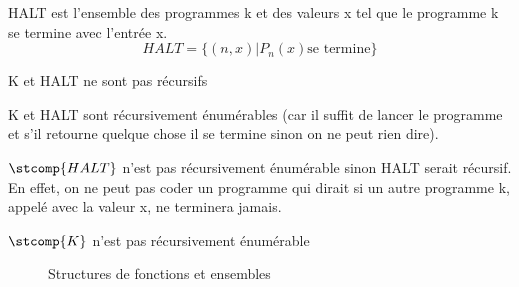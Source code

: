 \begin{mydef}[HALT]
	HALT est l'ensemble des programmes k et des valeurs x tel que le programme k se termine avec l'entrée x.
	\[ HALT = \{(n,x)|P_n(x)\text{se termine}\}\]
\end{mydef}

\begin{myprop}
	K et HALT ne sont pas récursifs
\end{myprop}

\begin{myprop}
	K et HALT sont récursivement énumérables (car il suffit de lancer le programme et s’il retourne quelque chose il se termine sinon on ne peut rien dire).
\end{myprop}

\begin{myprop}
	$\stcomp{HALT}$ n'est pas récursivement énumérable sinon HALT serait récursif.  En effet, on ne peut pas coder un programme qui dirait si un autre programme k, appelé avec la valeur x, ne terminera jamais.
\end{myprop}

\begin{myprop}
	$\stcomp{K}$ n'est pas récursivement énumérable
\end{myprop}

\begin{figure}[h]
  \centering
  \caption{Structures de fonctions et ensembles}
  \label{rb}
\end{figure}

